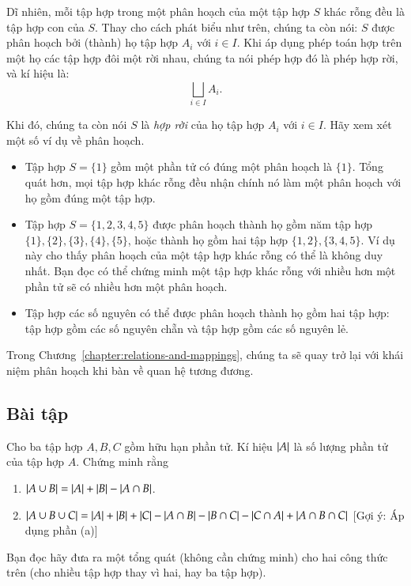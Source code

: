 Dĩ nhiên, mỗi tập hợp trong một phân hoạch của một tập hợp $S$ khác rỗng đều là tập hợp con của $S$. Thay cho cách phát biểu như trên, chúng ta còn nói: $S$ được phân hoạch bởi (thành) họ tập hợp $A_{i}$ với $i\in I$. Khi áp dụng phép toán hợp trên một họ các tập hợp đôi một rời nhau, chúng ta nói phép hợp đó là phép hợp rời, và kí hiệu là:
\[
    \bigsqcup_{i\in I}A_{i}.
\]

Khi đó, chúng ta còn nói $S$ là \textit{hợp rời} của họ tập hợp $A_{i}$ với $i\in I$. Hãy xem xét một số ví dụ về phân hoạch.
\begin{itemize}
    \item Tập hợp $S = \{ 1 \}$ gồm một phần tử có đúng một phân hoạch là $\{ 1 \}$. Tổng quát hơn, mọi tập hợp khác rỗng đều nhận chính nó làm một phân hoạch với họ gồm đúng một tập hợp.
    \item Tập hợp $S = \{ 1, 2, 3, 4, 5 \}$ được phân hoạch thành họ gồm năm tập hợp $\{ 1 \}, \{ 2 \}, \{ 3 \}, \{ 4 \}, \{ 5 \}$, hoặc thành họ gồm hai tập hợp $\{ 1, 2 \}, \{ 3, 4, 5 \}$. Ví dụ này cho thấy phân hoạch của một tập hợp khác rỗng có thể là không duy nhất. Bạn đọc có thể chứng minh một tập hợp khác rỗng với nhiều hơn một phần tử sẽ có nhiều hơn một phân hoạch.
    \item Tập hợp các số nguyên có thể được phân hoạch thành họ gồm hai tập hợp: tập hợp gồm các số nguyên chẵn và tập hợp gồm các số nguyên lẻ.
\end{itemize}

Trong Chương~\ref{chapter:relations-and-mappings}, chúng ta sẽ quay trở lại với khái niệm phân hoạch khi bàn về quan hệ tương đương.

\subsection{Bài tập}
\setcounter{exercise}{0}

\begin{exercise}\label{set-operations:exercise1}
    Cho ba tập hợp $A, B, C$ gồm hữu hạn phần tử. Kí hiệu $\left\vert{A}\right\vert$ là số lượng phần tử của tập hợp $A$. Chứng minh rằng
    \begin{enumerate}[label={(\alph*)}]
        \item $\left\vert{A\cup B}\right\vert = \left\vert{A}\right\vert + \left\vert{B}\right\vert - \left\vert{A\cap B}\right\vert$.
        \item $\left\vert{A\cup B\cup C}\right\vert = \left\vert{A}\right\vert + \left\vert{B}\right\vert + \left\vert{C}\right\vert - \left\vert{A\cap B}\right\vert - \left\vert{B\cap C}\right\vert - \left\vert{C\cap A}\right\vert + \left\vert{A\cap B\cap C}\right\vert$ [Gợi ý: Áp dụng phần (a)]
    \end{enumerate}

    Bạn đọc hãy đưa ra một tổng quát (không cần chứng minh) cho hai công thức trên (cho nhiều tập hợp thay vì hai, hay ba tập hợp).
\end{exercise}

